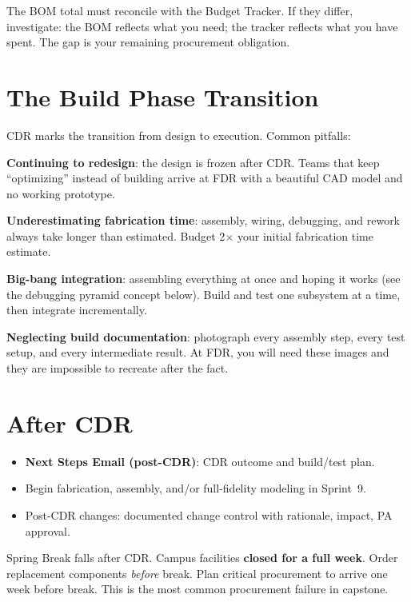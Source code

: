 The BOM total must reconcile with the Budget Tracker. If they differ, investigate: the BOM reflects what you need; the tracker reflects what you have spent. The gap is your remaining procurement obligation.

\section{The Build Phase Transition}
CDR marks the transition from design to execution. Common pitfalls:

\textbf{Continuing to redesign}: the design is frozen after CDR. Teams that keep ``optimizing'' instead of building arrive at FDR with a beautiful CAD model and no working prototype.

\textbf{Underestimating fabrication time}: assembly, wiring, debugging, and rework always take longer than estimated. Budget 2$\times$ your initial fabrication time estimate.

\textbf{Big-bang integration}: assembling everything at once and hoping it works (see the debugging pyramid concept below). Build and test one subsystem at a time, then integrate incrementally.

\textbf{Neglecting build documentation}: photograph every assembly step, every test setup, and every intermediate result. At FDR, you will need these images and they are impossible to recreate after the fact.

\section{After CDR}
\begin{itemize}[nosep,leftmargin=1.5em]
\item \textbf{Next Steps Email (post-CDR)}: CDR outcome and build/test plan.
\item Begin fabrication, assembly, and/or full-fidelity modeling in Sprint~9.
\item Post-CDR changes: documented change control with rationale, impact, PA approval.
\end{itemize}

\begin{warningbox}
Spring Break falls after CDR. Campus facilities \textbf{closed for a full week}. Order replacement components \emph{before} break. Plan critical procurement to arrive one week before break. This is the most common procurement failure in capstone.
\end{warningbox}


